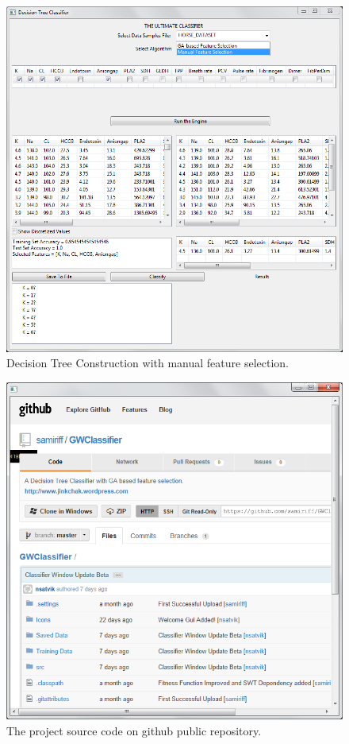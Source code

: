 \documentclass[12pt]{report}
\begin{document}
\begin{figure}[h!]
  
  \centering
    \includegraphics[scale=0.45]{dt_manual_selection.png}
\caption{Decision Tree Construction with manual feature selection.}
\end{figure}

\begin{figure}[h!]
  
  \centering
    \includegraphics[scale=0.45]{git_hub.png}
\caption{The project source code on github public repository.}
\end{figure}
\end{document}
